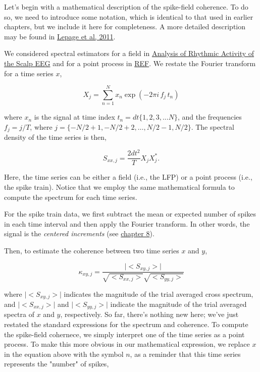 \documentclass[11pt]{article}
\begin{document}
Let's begin with a mathematical description of the spike-field
coherence. To do so, we need to introduce some notation, which is
identical to that used in earlier chapters, but we include it here for
completeness. A more detailed description may be found in
\href{https://www.ncbi.nlm.nih.gov/pubmed/21671792}{Lepage et al, 2011}.

We considered spectral estimators for a field in
\href{../Analysis\%20of\%20Rhythmic\%20Activity\%20in\%20the\%20Scalp\%20EEG/Analysis\%20of\%20rhythmic\%20activity\%20in\%20the\%20Scalp\%20EEG.ipynb}{Analysis
of Rhythmic Activity of the Scalp EEG} and for a point process in
\href{to\%20add}{REF}. We restate the Fourier transform for a time
series \(x\),

\[
X_j = \sum_{n=1}^N x_n \exp(-2 \pi i \, f_j \, t_n)
\]

where \(x_n\) is the signal at time index
\(t_n = dt \{1, 2, 3, . . . N\}\), and the frequencies \(f_j = j/T\),
where \(j=\{-N/2+1, -N/2+2, \ldots , N/2-1, N/2\}\). The spectral
density of the time series is then,

\[
S_{xx,j} = \frac{2 dt^2}{T} X_j X^*_j .
\]

Here, the time series can be either a field (i.e., the LFP) or a point
process (i.e., the spike train). Notice that we employ the same
mathematical formula to compute the spectrum for each time series.

    For the spike train data, we first subtract the mean or expected number
of spikes in each time interval and then apply the Fourier transform. In
other words, the signal is the \emph{centered increments} (see
\href{to\%20add}{chapter 8}).

    Then, to estimate the coherence between two time series \(x\) and \(y\),

\[
\kappa_{xy,j} = \frac{ \mid <S_{xy,j}> \mid }{ \sqrt{<S_{xx,j}>} \sqrt{<S_{yy,j}>}}
\label{eq:SF_k0}
\]

where \(\mid <S_{xy,j}> \mid\) indicates the magnitude of the trial
averaged cross spectrum, and \(\mid <S_{xx,j}> \mid\) and
\(\mid <S_{yy,j}> \mid\) indicate the magnitude of the trial averaged
spectra of \(x\) and \(y\), respectively. So far, there's nothing new
here; we've just restated the standard expressions for the spectrum and
coherence. To compute the spike-field cohernece, we simply interpret one
of the time series as a point process. To make this more obvious in our
mathematical expression, we replace \(x\) in the equation above with the
symbol \(n\), as a reminder that this time series represents the
"number" of spikes,
\end{document}
